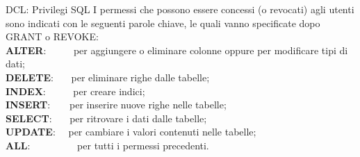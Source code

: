 \begin{frame}[fragile]{DCL: Privilegi SQL}
I permessi che possono essere concessi (o revocati) agli utenti sono indicati con le seguenti parole chiave, le quali vanno specificate dopo GRANT o REVOKE:
\newline
\\\textbf{ALTER}:~~~~~ per aggiungere o eliminare colonne oppure per modificare tipi di dati;
\\\textbf{DELETE}:~~~ per eliminare righe dalle tabelle;
\\\textbf{INDEX}:~~~~~ per creare indici;
\\\textbf{INSERT}:~~~~per inserire nuove righe nelle tabelle;
\\\textbf{SELECT}:~~~ per ritrovare i dati  dalle tabelle;
\\\textbf{UPDATE}:~~ per cambiare i valori contenuti nelle tabelle;
\\\textbf{ALL}:~~~~~~~~~ per tutti i permessi precedenti.
\end{frame}